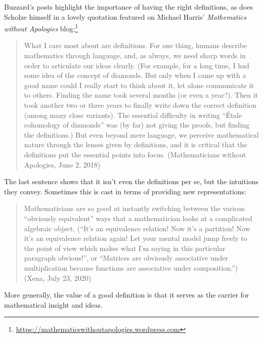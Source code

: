 \documentclass{amsart}
\theoremstyle{definition}
\theoremstyle{remark}
\numberwithin{equation}{section}
\begin{document}
Buzzard's posts highlight the importance of having the right definitions, as does Scholze himself in a lovely quotation featured on Michael Harris' \emph{Mathematics without Apologies} blog:\footnote{\url{https://mathematicswithoutapologies.wordpress.com}}
\begin{quote}
What I care most about are definitions. For one thing, humans describe mathematics through language, and, as always, we need sharp words in order to articulate our ideas clearly. (For example, for a long time, I had some idea of the concept of diamonds. But only when I came up with a good name could I really start to think about it, let alone communicate it to others. Finding the name took several months (or even a year?). Then it took another two or three years to finally write down the correct definition (among many close variants). The essential difficulty in writing ``\'Etale cohomology of diamonds'' was (by far) not giving the proofs, but finding the definitions.) But even beyond mere language, we perceive mathematical nature through the lenses given by definitions, and it is critical that the definitions put the essential points into focus. (Mathematicians without Apologies, June 2, 2018)
\end{quote}
The last sentence shows that it isn't even the definitions per se, but the intuitions they convey. Sometimes this is cast in terms of providing new representations:
\begin{quote}
  Mathematicians are so good at instantly switching between the various ``obviously equivalent'' ways that a mathematician looks at a complicated algebraic object. (``It’s an equivalence relation! Now it’s a partition! Now it’s an equivalence relation again! Let your mental model jump freely to the point of view which makes what I'm saying in this particular paragraph obvious!'', or ``Matrices are obviously associative under multiplication because functions are associative under composition.'') (Xena, July 23, 2020)
\end{quote}
More generally, the value of a good definition is that it serves as the carrier for mathematical insight and ideas.
\end{document}
